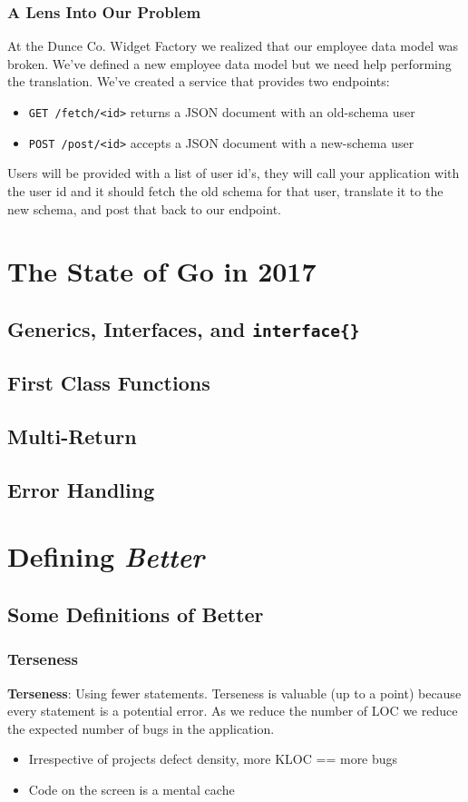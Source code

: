 \documentclass{beamer}
\begin{document}
\begin{frame}[fragile]
  \frametitle{A Lens Into Our Problem}
  At the Dunce Co. Widget Factory we realized that our employee data
  model was broken.  We've defined a new employee data model but we
  need help performing the translation. We've created a service that
  provides two endpoints:\\
  \vfill
  \begin{itemize}
  \item {\tt GET /fetch/<id>} returns a JSON document with an old-schema user
  \item {\tt POST /post/<id>} accepts a JSON document with a new-schema user
  \end{itemize}
  \vfill
  Users will be provided with a list of user id's, they will call your
  application with the user id and it should fetch the old schema for
  that user, translate it to the new schema, and post that back to our
  endpoint.
\end{frame}

\section{The State of Go in 2017}
\subsection{Generics, Interfaces, and \tt{interface\{\}}}
\subsection{First Class Functions}
\subsection{Multi-Return}
\subsection{Error Handling}
\section{Defining \emph{Better}}
\subsection{Some Definitions of Better}
\begin{frame}
  \frametitle{Terseness}
  {\bf Terseness}: Using fewer statements.
  \vfill
  Terseness is valuable (up to a point) because every statement is a
  potential error.  As we reduce the number of LOC we reduce the
  expected number of bugs in the application.
  \vfill
  \begin{itemize}
  \item Irrespective of projects defect density, more KLOC == more bugs
  \item Code on the screen is a mental cache
  \end{itemize}
\end{frame}
\end{document}
